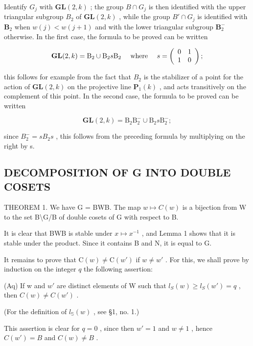 Identify \(G_{j}\) with \(\mathbf{GL}(2,k)\) ; the group \(B \cap G_{j}\) is then identified with the upper triangular subgroup \(B_{2}\) of \(\mathbf{GL}(2,k)\) , while the group \(B' \cap G_{j}\) is identified with \(\mathbf{B}_2\) when \(w(j) < w(j + 1)\) and with the lower triangular subgroup \(\mathbf{B}_2^-\) otherwise. In the first case, the formula to be proved can be written

\[
\mathbf {G L} (2, k) = \mathrm{B} _ {2} \cup \mathrm{B} _ {2} s \mathrm{B} _ {2} \quad \text { where } \quad s = \left( \begin{array}{c c} 0 & 1 \\ 1 & 0 \end{array} \right);
\]

this follows for example from the fact that \(B_{2}\) is the stabilizer of a point for the action of \(\mathbf{GL}(2,k)\) on the projective line \(\mathbf{P}_{1}(k)\) , and acts transitively on the complement of this point. In the second case, the formula to be proved can be written

\[
\mathbf {G L} (2, k) = \mathrm{B} _ {2} \mathrm{B} _ {2} ^ {-} \cup \mathrm{B} _ {2} s \mathrm{B} _ {2} ^ {-};
\]

since \(B_{2}^{-} = sB_{2}s\) , this follows from the preceding formula by multiplying on the right by s.

\subsection{DECOMPOSITION OF G INTO DOUBLE COSETS}

THEOREM 1. We have G = BWB. The map \(w \mapsto C(w)\) is a bijection from W to the set B\textbackslash G/B of double cosets of G with respect to B.

It is clear that BWB is stable under \(x \mapsto x^{-1}\) , and Lemma 1 shows that it is stable under the product. Since it contains B and N, it is equal to G.

It remains to prove that \(\mathrm{C}(w) \neq \mathrm{C}(w')\) if \(w \neq w'\) . For this, we shall prove by induction on the integer \(q\) the following assertion:

(Aq) If w and \(w'\) are distinct elements of W such that \(l_{S}(w) \geqslant l_{S}(w') = q\) , then \(C(w) \neq C(w')\) .

(For the definition of \(l_{\mathbb{S}}(w)\) , see §1, no. 1.)

This assertion is clear for \(q = 0\) , since then \(w' = 1\) and \(w \neq 1\) , hence \(C(w') = B\) and \(C(w) \neq B\) .

